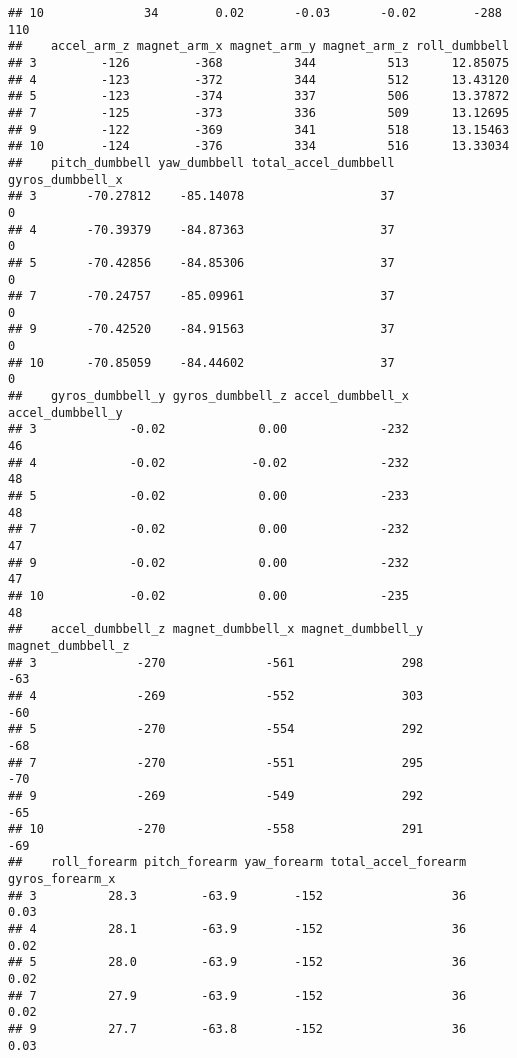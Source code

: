 \documentclass[]{article}
\begin{document}
\begin{verbatim}
## 10              34        0.02       -0.03       -0.02        -288         110
##    accel_arm_z magnet_arm_x magnet_arm_y magnet_arm_z roll_dumbbell
## 3         -126         -368          344          513      12.85075
## 4         -123         -372          344          512      13.43120
## 5         -123         -374          337          506      13.37872
## 7         -125         -373          336          509      13.12695
## 9         -122         -369          341          518      13.15463
## 10        -124         -376          334          516      13.33034
##    pitch_dumbbell yaw_dumbbell total_accel_dumbbell gyros_dumbbell_x
## 3       -70.27812    -85.14078                   37                0
## 4       -70.39379    -84.87363                   37                0
## 5       -70.42856    -84.85306                   37                0
## 7       -70.24757    -85.09961                   37                0
## 9       -70.42520    -84.91563                   37                0
## 10      -70.85059    -84.44602                   37                0
##    gyros_dumbbell_y gyros_dumbbell_z accel_dumbbell_x accel_dumbbell_y
## 3             -0.02             0.00             -232               46
## 4             -0.02            -0.02             -232               48
## 5             -0.02             0.00             -233               48
## 7             -0.02             0.00             -232               47
## 9             -0.02             0.00             -232               47
## 10            -0.02             0.00             -235               48
##    accel_dumbbell_z magnet_dumbbell_x magnet_dumbbell_y magnet_dumbbell_z
## 3              -270              -561               298               -63
## 4              -269              -552               303               -60
## 5              -270              -554               292               -68
## 7              -270              -551               295               -70
## 9              -269              -549               292               -65
## 10             -270              -558               291               -69
##    roll_forearm pitch_forearm yaw_forearm total_accel_forearm gyros_forearm_x
## 3          28.3         -63.9        -152                  36            0.03
## 4          28.1         -63.9        -152                  36            0.02
## 5          28.0         -63.9        -152                  36            0.02
## 7          27.9         -63.9        -152                  36            0.02
## 9          27.7         -63.8        -152                  36            0.03

\end{verbatim}
\end{document}
